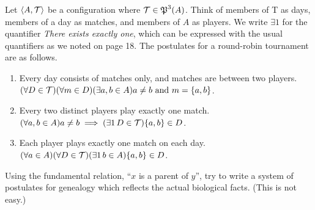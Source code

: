 \documentclass{report}
\renewcommand*{\land}{\text{ and }}
\begin{document}
\begin{solution}
Let $\left\langle A,\mathcal{T}\right\rangle$ be a configuration where $\mathcal{T} \in \operatorname{\mathfrak{P}}^3(A)$. Think of members of T as days,
members of a day as matches, and members of $A$ as players. We write $\exists 1$ for the quantifier
\textit{There exists exactly one}, which can be expressed with the usual quantifiers as we noted
on page 18. The postulates for a round-robin tournament are as follows.
\begin{enumerate}[label=(\roman*)]
    \item Every day consists of matches only, and matches are between two players.\\
        $(\forall D\in\mc T)(\forall m\in D)(\exists a,b\in A)a\neq b\land m=\set{a,b}$.
    \item Every two distinct players play exactly one match.\\
        $(\forall a,b\in A)a\neq b\implies(\exists 1\thinspace D\in\mc T)\set{a,b}\in D$.
    \item Each player plays exactly one match on each day.\\
        $(\forall a\in A)(\forall D\in\mc T)(\exists 1\thinspace b\in A)\set{a,b}\in D$.
\end{enumerate}
\end{solution}

\begin{exercise}
Using the fundamental relation, ``$x$ is a parent of $y$'', try to write a system of
postulates for genealogy which reflects the actual biological facts. (This is not easy.)
\end{exercise}
\end{document}
